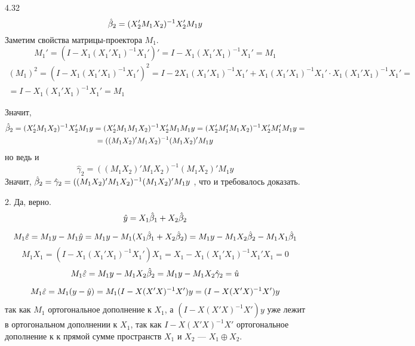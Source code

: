 \begin{solution}{{4.32}}
\[\hat{\beta}_2=(X_2'M_1X_2)^{-1}X_2'M_1y\]
Заметим свойства матрицы-проектора $M_1$.
\[M_1'=(I-X_1(X_1'X_1)^{-1}X_1')'=I-X_1(X_1'X_1)^{-1}X_1'=M_1\]
\begin{multline*}
(M_1)^2=(I-X_1(X_1'X_1)^{-1}X_1')^2=I-2X_1(X_1'X_1)^{-1}X_1'+X_1(X_1'X_1)^{-1}X_1'\cdot X_1(X_1'X_1)^{-1}X_1'=\\
=I-X_1(X_1'X_1)^{-1}X_1'=M_1
\end{multline*}

Значит,
\begin{multline*}
\hat{\beta}_2=(X_2'M_1X_2)^{-1}X_2'M_1y=(X_2'M_1M_1X_2)^{-1}X_2'M_1M_1y=(X_2'M_1'M_1X_2)^{-1}X_2'M_1'M_1y=\\=
((M_1X_2)'M_1X_2)^{-1}(M_1X_2)'M_1y
\end{multline*}
но ведь и
\[
\hat\gamma_2=
((M_1X_2)'M_1X_2)^{-1}(M_1X_2)'M_1y
\]
Значит, $\hat{\beta}_2=\hat\gamma_2=
((M_1X_2)'M_1X_2)^{-1}(M_1X_2)'M_1y$
, что и требовалось доказать.

2. Да, верно.
\[\hat{y}=X_1\hat{\beta}_1+X_2\hat{\beta}_2\]

\[M_1 \hat{\varepsilon}=M_1y-M_1\hat{y}=M_1y-M_1(X_1\hat\beta_1+X_2\hat{\beta}_2)=M_1y-M_1X_2\hat{\beta}_2-M_1X_1\hat\beta_1\]
\[M_1X_1=(I-X_1(X_1'X_1)^{-1}X_1')X_1=X_1-X_1(X_1'X_1)^{-1}X_1'X_1=0\]
\[M_1 \hat{\varepsilon}=M_1y-M_1X_2\hat{\beta}_2=M_1y-M_1X_2\hat\gamma_2=\hat u\]

\begin{multline*}
M_1\hat{\varepsilon}=M_1(y-\hat{y})=M_1(I-X(X'X)^{-1}X')y=(I-X(X'X)^{-1}X')y
\end{multline*}
так как $M_1$ ортогональное дополнение к $X_1$, а $(I-X(X'X)^{-1}X')y$ уже лежит в ортогональном дополнении к $X_1$, так как $I-X(X'X)^{-1}X'$ ортогональное дополнение к к прямой сумме пространств $X_1$ и $X_2$ — $X_1\oplus X_2$.
\end{solution}
\protect \hypertarget {soln:4.33}{}
